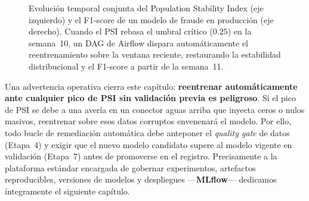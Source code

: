 \begin{figure}[htbp]
\caption{Evolución temporal conjunta del Population Stability Index (eje izquierdo) y el F1-score de un modelo de fraude en producción (eje derecho). Cuando el PSI rebasa el umbral crítico ($0.25$) en la semana~10, un DAG de Airflow dispara automáticamente el reentrenamiento sobre la ventana reciente, restaurando la estabilidad distribucional y el F1-score a partir de la semana~11.}
\label{fig:drift-psi-f1-evolucion}
\end{figure}

Una advertencia operativa cierra este capítulo: \textbf{reentrenar automáticamente ante cualquier pico de PSI sin validación previa es peligroso}. Si el pico de PSI se debe a una avería en un conector aguas arriba que inyecta ceros o nulos masivos, reentrenar sobre esos datos corruptos envenenará el modelo. Por ello, todo bucle de remediación automática debe anteponer el \textit{quality gate} de datos (Etapa~4) y exigir que el nuevo modelo candidato supere al modelo vigente en validación (Etapa~7) antes de promoverse en el registro. Precisamente a la plataforma estándar encargada de gobernar experimentos, artefactos reproducibles, versiones de modelos y despliegues ---\textbf{MLflow}--- dedicamos íntegramente el siguiente capítulo.
